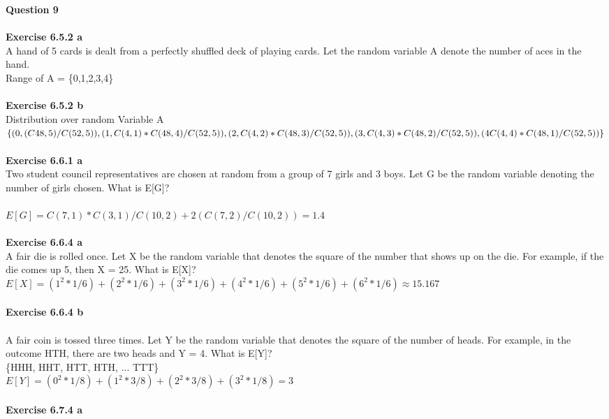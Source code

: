 \documentclass{article}
\begin{document}
\newpage
\noindent \textbf{Question 9}\\\\
\textbf{Exercise 6.5.2 a}\\
A hand of 5 cards is dealt from a perfectly shuffled deck of playing cards. Let the random variable A denote the number of aces in the hand.\\
Range of A = \{0,1,2,3,4\}\\\\
\textbf{Exercise 6.5.2 b}\\
Distribution over random Variable A\\
$\{(0,(C48,5)/C(52,5)),\\
(1,C(4,1)*C(48,4)/C(52,5)),\\
(2,C(4,2)*C(48,3)/C(52,5)),\\
(3,C(4,3)*C(48,2)/C(52,5)),\\
(4C(4,4)*C(48,1)/C(52,5))\}$\\\\
\textbf{Exercise 6.6.1 a}\\
Two student council representatives are chosen at random from a group of 7 girls and 3 boys. Let G be the random variable denoting the number of girls chosen. What is E[G]?\\\\
$E[G] = C(7,1)*C(3,1)/C(10,2) + 2(C(7,2)/C(10,2)) = 1.4$\\\\
\textbf{Exercise 6.6.4 a}\\
A fair die is rolled once. Let X be the random variable that denotes the square of the number that shows up on the die. For example, if the die comes up 5, then X = 25. What is E[X]?\\
$E[X] = (1^2 * 1/6) + (2^2 * 1/6) + (3^2 * 1/6) + (4^2 * 1/6) + (5^2 * 1/6) + (6^2 * 1/6) \approx 15.167$\\\\
\textbf{Exercise 6.6.4 b}\\\\
A fair coin is tossed three times. Let Y be the random variable that denotes the square of the number of heads. For example, in the outcome HTH, there are two heads and Y = 4. What is E[Y]?\\
\{HHH, HHT, HTT, HTH, ... TTT\}\\
$E[Y] = (0^2 * 1/8) + (1^2 *3/8)+ (2^2 *3/8)+ (3^2 *1/8) = 3$ \\\\
\textbf{Exercise 6.7.4 a}\\\\
\end{document}
